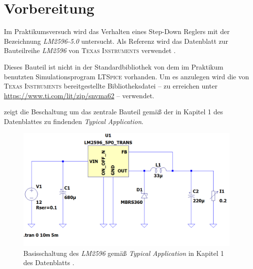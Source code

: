 \chapter{Vorbereitung}
	Im Praktikumsversuch wird das Verhalten eines Step-Down Reglers mit der Bezeichnung \textit{LM2596-5.0} untersucht.
	Als Referenz wird das Datenblatt zur Bauteilreihe \textit{LM2596} von \textsc{Texas Instruments} verwendet \cite{datasheet.LM2596.TexasInstruments.2021}.\par
	Dieses Bauteil ist nicht in der Standardbibliothek von dem im Praktikum benutzten Simulationsprogram \textsc{LTSpice} vorhanden.
	Um es anzulegen wird die von \textsc{Texas Instruments} bereitgestellte Bibliotheksdatei -- zu erreichen unter \url{https://www.ti.com/lit/zip/snvma62} --
	verwendet.\par\medskip
	 zeigt die Beschaltung um das zentrale Bauteil gemäß der in Kapitel 1 des Datenblattes zu findenden \textit{Typical Application}.
	\begin{figure}[h]
		\centering
		\includegraphics[width=.8\textwidth]{LTSpice/figures/basis_schematic_LM2596.png}
		\caption[Basisschaltung des \textit{LM2596}]{Basisschaltung des \textit{LM2596} gemäß \textit{Typical Application} in Kapitel 1 des Datenblatts \cite{datasheet.LM2596.TexasInstruments.2021}.}
		\label{fig:basisschaltung}
	\end{figure}